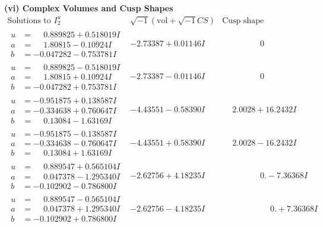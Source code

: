 \documentclass[1p]{elsarticle_modified}
\theoremstyle{definition}
\newcommand{\I}{\sqrt{-1}}
\begin{document}
\newpage\flushleft \textbf{(vi) Complex Volumes and Cusp Shapes}
$$\begin{array}{c|c|c}  
\text{Solutions to }I^u_{2}& \I (\text{vol} + \sqrt{-1}CS) & \text{Cusp shape}\\
 \hline 
\begin{aligned}
u &= \phantom{-}0.889825 + 0.518019 I \\
a &= \phantom{-}1.80815 - 0.10924 I \\
b &= -0.047282 - 0.753781 I\end{aligned}
 & -2.73387 + 0.01146 I & \phantom{-0.000000 } 0 \\ \hline\begin{aligned}
u &= \phantom{-}0.889825 - 0.518019 I \\
a &= \phantom{-}1.80815 + 0.10924 I \\
b &= -0.047282 + 0.753781 I\end{aligned}
 & -2.73387 - 0.01146 I & \phantom{-0.000000 } 0 \\ \hline\begin{aligned}
u &= -0.951875 + 0.138587 I \\
a &= -0.334638 + 0.760647 I \\
b &= \phantom{-}0.13084 - 1.63169 I\end{aligned}
 & -4.43551 - 0.58390 I & \phantom{-}2.0028 + 16.2432 I \\ \hline\begin{aligned}
u &= -0.951875 - 0.138587 I \\
a &= -0.334638 - 0.760647 I \\
b &= \phantom{-}0.13084 + 1.63169 I\end{aligned}
 & -4.43551 + 0.58390 I & \phantom{-}2.0028 - 16.2432 I \\ \hline\begin{aligned}
u &= \phantom{-}0.889547 + 0.565104 I \\
a &= \phantom{-}0.047378 - 1.295340 I \\
b &= -0.102902 - 0.786800 I\end{aligned}
 & -2.62756 + 4.18235 I & \phantom{-0.000000 } 0. - 7.36368 I \\ \hline\begin{aligned}
u &= \phantom{-}0.889547 - 0.565104 I \\
a &= \phantom{-}0.047378 + 1.295340 I \\
b &= -0.102902 + 0.786800 I\end{aligned}
 & -2.62756 - 4.18235 I & \phantom{-0.000000 -}0. + 7.36368 I \\ \hline\begin{aligned}

\end{aligned}
\end{array}$$
\end{document}
